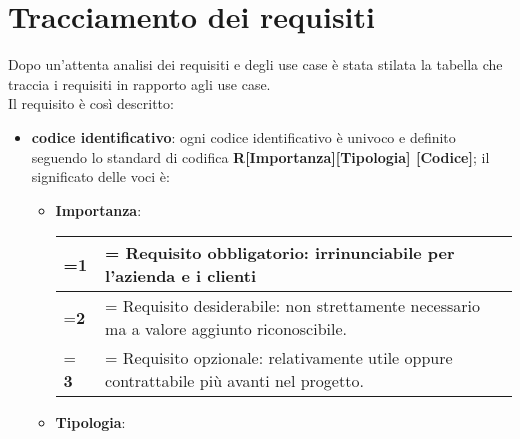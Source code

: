 \newpage             
            
\section{Tracciamento dei requisiti}

Dopo un'attenta analisi dei requisiti e degli use case è stata stilata la tabella che traccia i requisiti in rapporto agli use case.\\
Il requisito è così descritto:
    \begin{itemize}
    \setlength\itemsep{1em}

        \item \textbf{codice identificativo}: ogni codice 				identificativo è univoco e definito seguendo lo 					standard di codifica \textbf{R[Importanza][Tipologia]				[Codice]}; il significato delle voci è:
        \begin{itemize}
        \setlength\itemsep{1em}

            \item \textbf{Importanza}:
            \begin{center}
                
                \renewcommand{\arraystretch}{1.8}
                \renewcommand\tabularxcolumn[1]{m{#1}}
                \begin{tabularx}{0.85\textwidth} {
                    >{\hsize=0.1\hsize\linewidth=\hsize}X
                    >{\hsize=1.9\hsize\linewidth=\hsize}X
                }
                    \hline
                    \textbf{1} & Requisito obbligatorio: 								irrinunciabile per l'azienda e i clienti \\
                    \hline
                    \textbf{2} & Requisito desiderabile: non 							strettamente necessario ma  a valore 							aggiunto riconoscibile. \\
                    \hline
                    \textbf{3} &  Requisito opzionale: 								relativamente utile oppure contrattabile 							più avanti nel progetto. \\
                    \hline
                \end{tabularx}
                \smallskip
            \end{center}
			
            \item \textbf{Tipologia}:
            \begin{center}
                

\end{center}
\end{itemize}
\end{itemize}
